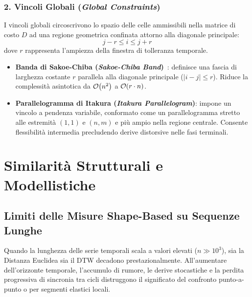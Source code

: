 \subsubsection{2. Vincoli Globali (\textit{Global Constraints})}
I vincoli globali circoscrivono lo spazio delle celle ammissibili nella matrice di costo $D$ ad una regione geometrica confinata attorno alla diagonale principale:
\begin{equation}
j - r \le i \le j + r
\end{equation}
dove $r$ rappresenta l'ampiezza della finestra di tolleranza temporale.
\begin{itemize}
    \item \textbf{Banda di Sakoe-Chiba (\textit{Sakoe-Chiba Band})}~\cite{sakoe1978}: definisce una fascia di larghezza costante $r$ parallela alla diagonale principale ($|i - j| \le r$). Riduce la complessit\`a asintotica da $\mathcal{O}\!\left(n^2\right)$ a $\mathcal{O}\!\left(r \cdot n\right)$.
    \item \textbf{Parallelogramma di Itakura (\textit{Itakura Parallelogram})}: impone un vincolo a pendenza variabile, conformato come un parallelogramma stretto alle estremit\`a $(1,1)$ e $(n,m)$ e pi\`u ampio nella regione centrale. Consente flessibilit\`a intermedia precludendo derive distorsive nelle fasi terminali.
\end{itemize}

\FloatBarrier
\section{Similarit\`a Strutturali e Modellistiche}
\label{sec:ts-structural-model-similarity}

\FloatBarrier
\subsection{Limiti delle Misure Shape-Based su Sequenze Lunghe}
\label{subsec:ts-limits-long-series}

Quando la lunghezza delle serie temporali scala a valori elevati ($n \gg 10^3$), sia la Distanza Euclidea sia il DTW decadono prestazionalmente. All'aumentare dell'orizzonte temporale, l'accumulo di rumore, le derive stocastiche e la perdita progressiva di sincronia tra cicli distruggono il significato del confronto punto-a-punto o per segmenti elastici locali.

